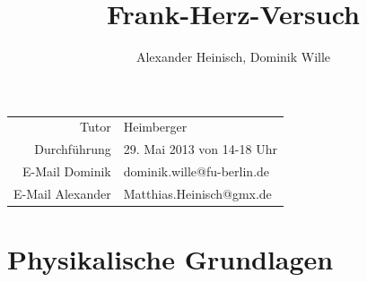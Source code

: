 \documentclass{article}
\title{Frank-Herz-Versuch}
\author{Alexander Heinisch, Dominik Wille}
\begin{document}
\maketitle

{\begin{center}
\begin{minipage}{\linewidth}
\centering
{}
\label{wtd}
\end{minipage}
\end{center}

\vspace{7cm}
\noindent
\begin{center}
\begin{tabular}{r l}
Tutor & Heimberger\\
Durchführung & 29. Mai 2013 von 14-18 Uhr \\

E-Mail Dominik & dominik.wille@fu-berlin.de \\
E-Mail Alexander & Matthias.Heinisch@gmx.de \\
\end{tabular}
\end{center}

\newpage
\tableofcontents
\newpage

\section{Physikalische Grundlagen}
}
\end{document}
